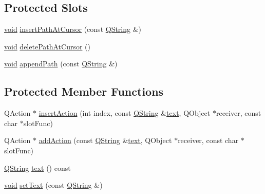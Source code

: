 \subsection*{\-Protected \-Slots}
\begin{DoxyCompactItemize}
\item 
\hyperlink{group___u_a_v_objects_plugin_ga444cf2ff3f0ecbe028adce838d373f5c}{void} \hyperlink{class_utils_1_1_path_list_editor_ab3be814407ee47387ca049bfd93780fb}{insert\-Path\-At\-Cursor} (const \hyperlink{group___u_a_v_objects_plugin_gab9d252f49c333c94a72f97ce3105a32d}{\-Q\-String} \&)
\item 
\hyperlink{group___u_a_v_objects_plugin_ga444cf2ff3f0ecbe028adce838d373f5c}{void} \hyperlink{class_utils_1_1_path_list_editor_a117c18f87a59dac54632f3b5e775bd72}{delete\-Path\-At\-Cursor} ()
\item 
\hyperlink{group___u_a_v_objects_plugin_ga444cf2ff3f0ecbe028adce838d373f5c}{void} \hyperlink{class_utils_1_1_path_list_editor_acf378616452930cf50c4a54957e5d142}{append\-Path} (const \hyperlink{group___u_a_v_objects_plugin_gab9d252f49c333c94a72f97ce3105a32d}{\-Q\-String} \&)
\end{DoxyCompactItemize}
\subsection*{\-Protected \-Member \-Functions}
\begin{DoxyCompactItemize}
\item 
\-Q\-Action $\ast$ \hyperlink{class_utils_1_1_path_list_editor_a5ff6cc4033c262c8f3925446b6266280}{insert\-Action} (int index, const \hyperlink{group___u_a_v_objects_plugin_gab9d252f49c333c94a72f97ce3105a32d}{\-Q\-String} \&\hyperlink{class_utils_1_1_path_list_editor_afe432e8e2962ada8ff59067ae2403b72}{text}, \-Q\-Object $\ast$receiver, const char $\ast$slot\-Func)
\item 
\-Q\-Action $\ast$ \hyperlink{class_utils_1_1_path_list_editor_a7ad40d88b0bf500e8592c54089f37160}{add\-Action} (const \hyperlink{group___u_a_v_objects_plugin_gab9d252f49c333c94a72f97ce3105a32d}{\-Q\-String} \&\hyperlink{class_utils_1_1_path_list_editor_afe432e8e2962ada8ff59067ae2403b72}{text}, \-Q\-Object $\ast$receiver, const char $\ast$slot\-Func)
\item 
\hyperlink{group___u_a_v_objects_plugin_gab9d252f49c333c94a72f97ce3105a32d}{\-Q\-String} \hyperlink{class_utils_1_1_path_list_editor_afe432e8e2962ada8ff59067ae2403b72}{text} () const 
\item 
\hyperlink{group___u_a_v_objects_plugin_ga444cf2ff3f0ecbe028adce838d373f5c}{void} \hyperlink{class_utils_1_1_path_list_editor_a29e4a886c1d4e3923dc2f9f3d625835e}{set\-Text} (const \hyperlink{group___u_a_v_objects_plugin_gab9d252f49c333c94a72f97ce3105a32d}{\-Q\-String} \&)
\end{DoxyCompactItemize}
